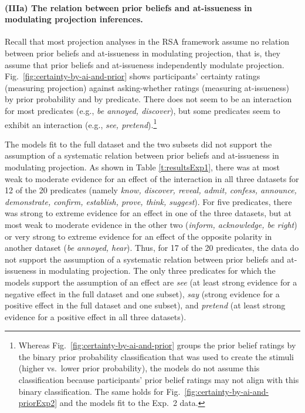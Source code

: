 \documentclass[11pt,fleqn]{article}
\newcommand{\6}{\mbox{$[\hspace*{-.6mm}[$}}
\newcommand{\9}{\mbox{$]\hspace*{-.6mm}]$}}
\begin{document}
\paragraph{(IIIa) The relation between prior beliefs and at-issueness in modulating projection inferences.} Recall that most projection analyses in the RSA framework assume no relation between prior beliefs and at-issueness in modulating projection, that is, they assume that prior beliefs and at-issueness independently modulate projection. Fig.~\ref{fig:certainty-by-ai-and-prior} shows participants' certainty ratings (measuring projection) against asking-whether ratings (measuring at-issueness) by prior probability and by predicate. There does not seem to be an interaction for most predicates (e.g., {\em be annoyed, discover}), but some predicates seem to exhibit an interaction (e.g., {\em see, pretend}).\footnote{Whereas Fig.~\ref{fig:certainty-by-ai-and-prior} groups the prior belief ratings by the binary prior probability classification that was used to create the stimuli (higher vs.\ lower prior probability), the models  do not assume this classification because participants' prior belief ratings may not align with this binary classification. The same holds for Fig.~\ref{fig:certainty-by-ai-and-priorExp2} and the models fit to the Exp.~2 data.}

The models fit to the full dataset and the two subsets did not support the assumption of a systematic relation between prior beliefs and at-issueness in modulating projection. As shown in Table \ref{t:resultsExp1}, there was at most weak to moderate evidence for an effect of the interaction in all three datasets for 12 of the 20 predicates (namely {\em know, discover, reveal, admit, confess, announce, demonstrate, confirm, establish, prove, think, suggest}). For five predicates, there was strong to extreme evidence for an effect in one of the three datasets, but at most weak to moderate evidence in the other two ({\em inform, acknowledge, be right}) or very strong to extreme evidence for an effect of the opposite polarity in another dataset ({\em be annoyed, hear}).  Thus, for 17 of the 20 predicates, the data do not support the assumption of a systematic relation between prior beliefs and at-issueness in modulating projection. The only three predicates for which the models support the assumption of an effect are {\em see} (at least strong evidence for a negative effect in the full dataset and one subset), {\em say} (strong evidence for a positive effect in the full dataset and one subset), and {\em pretend} (at least strong evidence for a positive effect in all three datasets). 
\end{document}
